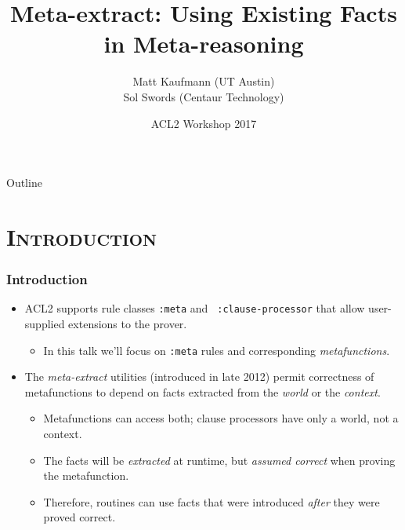 
\newcommand\mydotdot{{\color{orange} ...}}





\begin{frame}
\title{Meta-extract: Using Existing Facts in Meta-reasoning}
\author{
        Matt Kaufmann (UT Austin) \\
        Sol Swords (Centaur Technology)
}
\date{
        \vspace{1cm}
        ACL2 Workshop 2017
}
\titlepage
\end{frame}
\begin{frame}{\hspace{4mm}Outline}
\tableofcontents
\end{frame}
\section{\scshape Introduction}
\begin{frame}[fragile]
\frametitle{Introduction}

\begin{itemize}

\item ACL2 supports rule classes {\tt :meta} and {\tt
    :clause-processor} that allow user-supplied extensions to the
  prover.
  
  \begin{itemize}
  \item In this talk we'll focus on {\tt :meta} rules and corresponding
    {\em metafunctions}.
  \end{itemize}
  
\item The {\em meta-extract} utilities (introduced in late 2012)
  permit correctness of metafunctions to depend on facts extracted
  from the {\em world} or the {\em context}.

  \begin{itemize}
  \item Metafunctions can access both; clause processors have only a world, not a context.
  \item The facts will be \textit{extracted} at runtime, but \textit{assumed correct} when proving the metafunction.
  \item Therefore, routines can use facts that were introduced \textit{after} they were proved correct.
  \end{itemize}
\end{itemize}
\end{frame}

